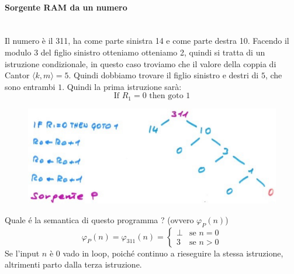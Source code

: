 \documentclass{article}
\begin{document}
\paragraph{Sorgente RAM da un numero}\mbox{}\\
Il numero è il 311, ha come parte sinistra 14 e come parte destra 10. Facendo il modulo 3
del figlio sinistro otteniamo otteniamo 2, quindi si tratta di un istruzione condizionale,
in questo caso troviamo che il valore della coppia di Cantor $\langle k,m\rangle = 5$. Quindi
dobbiamo trovare il figlio sinistro e destri di $5$, che sono entrambi $1$. Quindi
la prima istruzione sarà:
$$\text{If }R_1=0\text{ then goto }1$$
\begin{figure}[H]
    \centering
    \includegraphics[scale=0.5]{images/sorgente_p.png}

\end{figure}
Quale é la semantica di questo programma ? (ovvero $\varphi_P(n)$)
\[
    \varphi_P(n)=\varphi_{311}(n)=
    \begin{cases}
        \bot & \text{se }n=0 \\
        3    & \text{se }n>0
    \end{cases}
\]
Se l'input $n$ è 0 vado in loop, poiché continuo a rieseguire la stessa istruzione,
altrimenti parto dalla terza istruzione.
\end{document}

